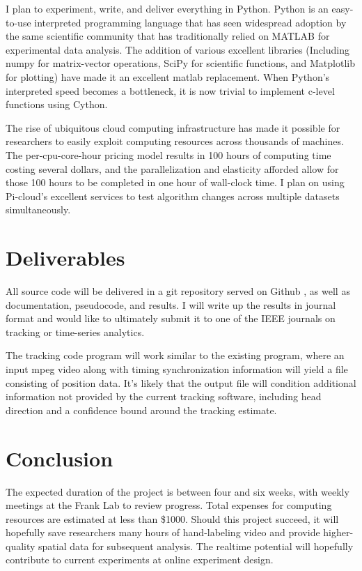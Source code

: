 \documentclass{article}
\begin{document}
I plan to experiment, write, and deliver everything in Python. Python
is an easy-to-use interpreted programming language that has seen
widespread adoption by the same scientific community that has
traditionally relied on MATLAB for experimental data analysis. The
addition of various excellent libraries (Including numpy \cite{numpy}
for matrix-vector operations, SciPy \cite{scipy} for scientific
functions, and Matplotlib \cite{matplotlib} for plotting) have made it
an excellent matlab replacement. When Python's interpreted speed
becomes a bottleneck, it is now trivial to implement c-level functions
using Cython\cite{cython}.

The rise of ubiquitous cloud computing infrastructure has made it
possible for researchers to easily exploit computing resources across
thousands of machines. The per-cpu-core-hour pricing model results in
100 hours of computing time costing several dollars, and the
parallelization and elasticity afforded allow for those 100 hours to
be completed in one hour of wall-clock time. I plan on using
Pi-cloud's excellent services \cite{picloud} to test algorithm changes
across multiple datasets simultaneously.

\section{Deliverables}
All source code will be delivered in a git repository served on Github
\cite{github}, as well as documentation, pseudocode, and results. I
will write up the results in journal format and would like to
ultimately submit it to one of the IEEE journals on tracking or
time-series analytics.

The tracking code program will work similar to the existing program,
where an input mpeg video along with timing synchronization
information will yield a file consisting of position data. It's likely
that the output file will condition additional information not
provided by the current tracking software, including head direction
and a confidence bound around the tracking estimate.


\section{Conclusion}
The expected duration of the project is between four and six weeks,
with weekly meetings at the Frank Lab to review progress. Total
expenses for computing resources are estimated at less than
\$1000. Should this project succeed, it will hopefully save
researchers many hours of hand-labeling video and provide
higher-quality spatial data for subsequent analysis. The realtime
potential will hopefully contribute to current experiments at online
experiment design.

\printbibliography
\end{document}
